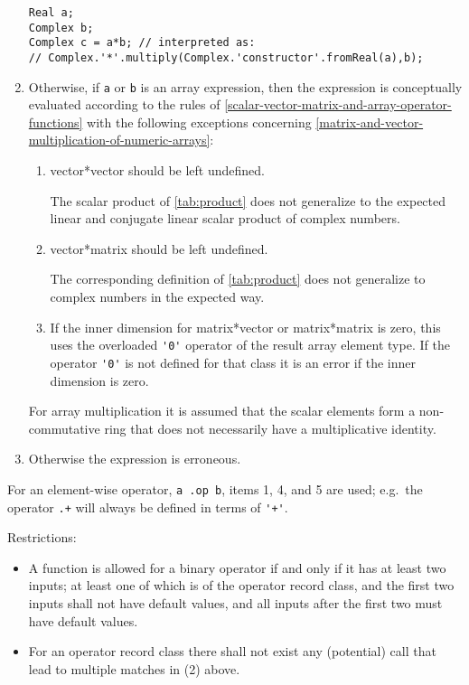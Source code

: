 \begin{enumerate}
\begin{nonnormative}
\begin{lstlisting}[language=modelica]
Real a;
Complex b;
Complex c = a*b; // interpreted as:
// Complex.'*'.multiply(Complex.'constructor'.fromReal(a),b);
\end{lstlisting}
\end{nonnormative}
\item
  Otherwise, if \lstinline!a! or \lstinline!b! is an array expression, then the expression is
  conceptually evaluated according to the rules of \cref{scalar-vector-matrix-and-array-operator-functions} with the
  following exceptions concerning \cref{matrix-and-vector-multiplication-of-numeric-arrays}:
  \begin{enumerate}
  \def\labelenumii{(\alph{enumii})}
  \item
    vector*vector should be left undefined.
    \begin{nonnormative}
    The scalar product of \cref{tab:product} does not generalize to the expected linear and conjugate linear scalar product of complex numbers.
    \end{nonnormative}
  \item
    vector*matrix should be left undefined.
    \begin{nonnormative}
    The corresponding definition of \cref{tab:product} does not generalize to complex numbers in the expected way.
    \end{nonnormative}
  \item
    If the inner dimension for matrix*vector or matrix*matrix is zero,
    this uses the overloaded \lstinline!'0'! operator of the result array element
    type. If the operator \lstinline!'0'! is not defined for that class it is an
    error if the inner dimension is zero.
  \end{enumerate}

\begin{nonnormative}
For array multiplication it is assumed that the scalar elements
form a non-commutative ring that does not necessarily have a
multiplicative identity.
\end{nonnormative}

\item
  Otherwise the expression is erroneous.
\end{enumerate}

For an element-wise operator, \lstinline!a .op b!, items 1, 4, and 5 are used; e.g.\ the operator \lstinline!.+! will always be defined in terms of \lstinline!'+'!.

Restrictions:
\begin{itemize}
\item
  A function is allowed for a binary operator if and only if it has at
  least two inputs; at least one of which is of the operator record
  class, and the first two inputs shall not have default values, and all
  inputs after the first two must have default values.
\item
  For an operator record class there shall not exist any
  (potential) call that lead to multiple matches in (2) above.
\end{itemize}

